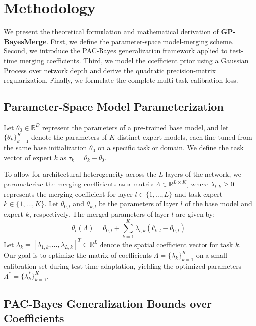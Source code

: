 \section{Methodology}
\label{sec:method}

We present the theoretical formulation and mathematical derivation of
\textbf{GP-BayesMerge}. First, we define the parameter-space model-merging
scheme. Second, we introduce the PAC-Bayes generalization framework applied to
test-time merging coefficients. Third, we model the coefficient prior using a
Gaussian Process over network depth and derive the quadratic precision-matrix
regularization. Finally, we formulate the complete multi-task calibration loss.

\subsection{Parameter-Space Model Parameterization}

Let $\theta_0 \in \mathbb{R}^D$ represent the parameters of a pre-trained base
model, and let $\{\theta_k\}_{k=1}^K$ denote the parameters of $K$ distinct
expert models, each fine-tuned from the same base initialization $\theta_0$ on a
specific task or domain. We define the task vector of expert $k$ as $\tau_k =
\theta_k - \theta_0$.

To allow for architectural heterogeneity across the $L$ layers of the network,
we parameterize the merging coefficients as a matrix $\Lambda \in \mathbb{R}^{L
\times K}$, where $\lambda_{l, k} \ge 0$ represents the merging coefficient for
layer $l \in \{1, \dots, L\}$ and task expert $k \in \{1, \dots, K\}$. Let
$\theta_{0, l}$ and $\theta_{k, l}$ be the parameters of layer $l$ of the base
model and expert $k$, respectively. The merged parameters of layer $l$ are given
by:
\begin{equation}
\theta_l(\Lambda) = \theta_{0, l} + \sum_{k=1}^K \lambda_{l, k} (\theta_{k, l} - \theta_{0, l})
\label{eq:param_interp}
\end{equation}
Let $\lambda_k = [\lambda_{1, k}, \dots, \lambda_{L, k}]^T \in \mathbb{R}^L$
denote the spatial coefficient vector for task $k$. Our goal is to optimize the
matrix of coefficients $\Lambda = \{\lambda_k\}_{k=1}^K$ on a small calibration
set during test-time adaptation, yielding the optimized parameters $\Lambda^* = \{\lambda_k^*\}_{k=1}^K$.

\subsection{PAC-Bayes Generalization Bounds over Coefficients}

